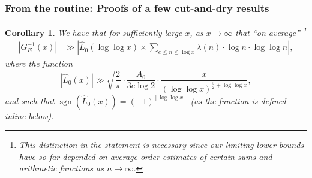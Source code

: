 \documentclass[11pt,reqno,a4letter]{article}
\numberwithin{figure}{section}
\numberwithin{table}{section}
\newcommand{\floor}[1]{\left\lfloor #1 \right\rfloor}
\theoremstyle{plain}
\newtheorem{cor}[theorem]{Corollary}
\numberwithin{theorem}{section}
\theoremstyle{definition}
\newcommand{\NBRef}[1]{}
\newcommand{\SuccSim}[0]{\overset{_{\scriptsize{\blacktriangle}}}{\succsim}}
\renewcommand{\SuccSim}[0]{\ensuremath{\gg}}
\begin{document}
\subsubsection{From the routine: Proofs of a few cut-and-dry results} 
\label{subsubSection_RoutineProofsNeededForMainBoundOnGInvxFunc} 

\begin{cor} 
\label{cor_ASemiForm_ForGInvx_v1} 
We have that for sufficiently large $x$, as $x \rightarrow \infty$ that 
``on average'' \footnote{ 
     This distinction in the statement is necessary since our limiting lower bounds have 
     so far depended on average order estimates of certain sums and arithmetic functions 
     as $n \rightarrow \infty$. 
} 
\begin{align*} 
\left\lvert G_E^{-1}(x) \right\rvert & \SuccSim 
     \left\lvert 
     \widehat{L}_0\left(\log\log x\right) \times \sum_{e \leq n \leq \log x} 
     \lambda(n) \cdot \log n \cdot \log\log n \right\rvert, 
\end{align*} 
where the function 
\[
\left\lvert \widehat{L}_0(x) \right\rvert \SuccSim 
     \sqrt{\frac{2}{\pi}} \cdot \frac{A_0}{3e \log 2} \cdot 
     \frac{x}{(\log\log x)^{\frac{5}{2} + \log\log x}}, 
\]
and such that $\operatorname{sgn}(\widehat{L}_0(x)) = (-1)^{\floor{\log\log x}}$ 
(as the function is defined inline below). 
\end{cor} 
\NBRef{A10-2020.04-26} 
\end{document}
